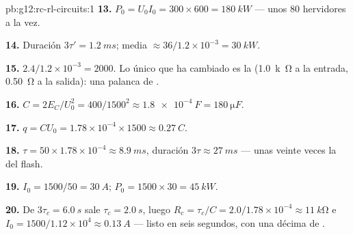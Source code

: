 \begin{solution}{pb:g12:rc-rl-circuits:1}
\textbf{13.} $P_0 = U_0 I_0 = 300 \times 600 = \qty{180}{kW}$ --- unos
$80$ hervidores a la vez.

\textbf{14.} Duración $3\tau' = \qty{1.2}{ms}$;  media
$\approx 36/1.2\times10^{-3} = \qty{30}{kW}$.

\textbf{15.} $2.4/1.2\times10^{-3} = 2000$. Lo único que ha cambiado es
la  (\qty{1.0}{k\ohm} a la entrada, \qty{0.50}{\ohm} a la
salida): una palanca de .

\textbf{16.} $C = 2E_C/U_0^2 = 400/1500^2 \approx \qty{1.8e-4}{F} =
\qty{180}{\micro F}$.

\textbf{17.} $q = CU_0 = 1.78\times10^{-4} \times 1500 \approx
\qty{0.27}{C}$.

\textbf{18.} $\tau = 50 \times 1.78\times10^{-4} \approx \qty{8.9}{ms}$,
duración $3\tau \approx \qty{27}{ms}$ --- unas veinte veces la del
flash.

\textbf{19.} $I_0 = 1500/50 = \qty{30}{A}$;
$P_0 = 1500 \times 30 = \qty{45}{kW}$.

\textbf{20.} De $3\tau_c = \qty{6.0}{s}$ sale $\tau_c = \qty{2.0}{s}$,
luego $R_c = \tau_c/C = 2.0/1.78\times10^{-4} \approx \qty{11}{k\ohm}$ e
$I_0 = 1500/1.12\times10^{4} \approx \qty{0.13}{A}$ --- listo en seis
segundos, con una décima de .
\end{solution}
